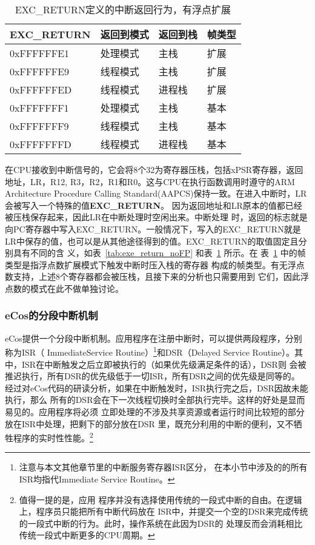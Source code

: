 \begin{table}[htb]
	\centering
	\caption{EXC\_RETURN定义的中断返回行为，有浮点扩展}
	\label{tab:exe_return_FP}
	\begin{tabularx}{\linewidth}{XXXX}
		\toprule[1.5pt]
		{\heiti EXC\_RETURN} & {\heiti 返回到模式} & {\heiti 返回到栈} &
		{\heiti 帧类型}\\
		\midrule[1pt]
		0xFFFFFFE1 & 处理模式 & 主栈 & 扩展\\
		\midrule[0.5pt]
		0xFFFFFFE9 & 线程模式 & 主栈 & 扩展\\
		\midrule[0.5pt]
		0xFFFFFFED & 线程模式 & 进程栈 & 扩展\\
		\midrule[0.5pt]
		0xFFFFFFF1 & 处理模式 & 主栈 & 基本\\
		\midrule[0.5pt]
		0xFFFFFFF9 & 线程模式 & 主栈 & 基本\\
		\midrule[0.5pt]
		0xFFFFFFFD & 线程模式 & 进程栈 & 基本\\
		\bottomrule[1.5pt]
	\end{tabularx}
\end{table}

在CPU接收到中断信号的，它会将8个32为寄存器压栈，包括xPSR寄存器，返回地址，LR，R12,
R3，R2，R1和R0。这与CPU在执行函数调用时遵守的ARM Architecture Procedure Calling
Standard(AAPCS)保持一致。在进入中断时，LR会被写入一个特殊的值\textbf{EXC\_RETURN}。
因为返回地址和LR原本的值都已经被压栈保存起来，因此LR在中断处理时空闲出来。中断处理
时，返回的标志就是向PC寄存器中写入EXC\_RETURN。一般情况下，写入的EXC\_RETURN就是
LR中保存的值，也可以是从其他途径得到的值。EXC\_RETURN的取值固定且分别具有不同的含
义，如表~\ref{tab:exe_return_noFP} 和表~\ref{tab:exe_return_FP} 所示。在
表~\ref{tab:exe_return_FP} 中的帧类型是指浮点数扩展模式下触发中断时压入栈的寄存器
构成的帧类型。有无浮点数支持，上述8个寄存器都会被压栈，且接下来的分析也只需要用到
它们，因此浮点数的模式在此不做单独讨论。\cite{ARM} 

\subsubsection{eCos的分段中断机制} 
\label{subsubsec:ecos_intr}

eCos提供一个分段中断机制。应用程序在注册中断时，可以提供两段程序，分别称为ISR（
ImmediateService Routine）\footnote{注意与本文其他章节里的中断服务寄存器ISR区分，
在本小节中涉及的的所有ISR均指代Immediate Service Routine。}和DSR（Delayed Service 
Routine）。其中，ISR在中断触发之后立即被执行的（如果优先级满足条件的话），DSR则
会被推迟执行，所有DSR的优先级低于一切ISR，所有DSR之间的优先级是同等的。\cite{ecos_isr}
经过对eCos代码的研读分析，如果在中断触发时，ISR执行完之后，DSR因故未能执行，那么
所有的DSR会在下一次线程切换时全部执行完毕。这样的好处是显而易见的。应用程序将必须
立即处理的不涉及共享资源或者运行时间比较短的部分放在ISR中处理，把剩下的部分放在DSR
里，既充分利用的中断的便利，又不牺牲程序的实时性性能。\footnote{值得一提的是，应用
程序并没有选择使用传统的一段式中断的自由。在逻辑上，程序员只能把所有中断代码放在
ISR中，并提交一个空的DSR来完成传统的一段式中断的行为。此时，操作系统在此因为DSR的
处理反而会消耗相比传统一段式中断更多的CPU周期。}

